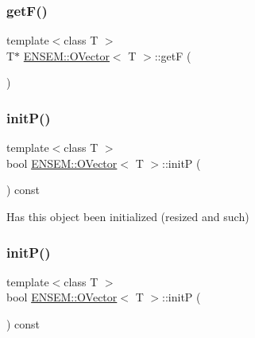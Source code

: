 \subsubsection{\texorpdfstring{getF()}{getF()}\hspace{0.1cm}{\footnotesize\ttfamily [4/4]}}
{\footnotesize\ttfamily template$<$class T $>$ \\
T$\ast$ \mbox{\hyperlink{classENSEM_1_1OVector}{E\+N\+S\+E\+M\+::\+O\+Vector}}$<$ T $>$\+::getF (\begin{DoxyParamCaption}{ }\end{DoxyParamCaption})\hspace{0.3cm}{\ttfamily [inline]}}

\mbox{\label{classENSEM_1_1OVector_ae1c9e62826d9b61edc7f85d8f8aedf79}} 
\subsubsection{\texorpdfstring{initP()}{initP()}\hspace{0.1cm}{\footnotesize\ttfamily [1/2]}}
{\footnotesize\ttfamily template$<$class T $>$ \\
bool \mbox{\hyperlink{classENSEM_1_1OVector}{E\+N\+S\+E\+M\+::\+O\+Vector}}$<$ T $>$\+::initP (\begin{DoxyParamCaption}{ }\end{DoxyParamCaption}) const\hspace{0.3cm}{\ttfamily [inline]}}



Has this object been initialized (resized and such) 

\mbox{\label{classENSEM_1_1OVector_ae1c9e62826d9b61edc7f85d8f8aedf79}} 
\subsubsection{\texorpdfstring{initP()}{initP()}\hspace{0.1cm}{\footnotesize\ttfamily [2/2]}}
{\footnotesize\ttfamily template$<$class T $>$ \\
bool \mbox{\hyperlink{classENSEM_1_1OVector}{E\+N\+S\+E\+M\+::\+O\+Vector}}$<$ T $>$\+::initP (\begin{DoxyParamCaption}{ }\end{DoxyParamCaption}) const\hspace{0.3cm}{\ttfamily [inline]}}



